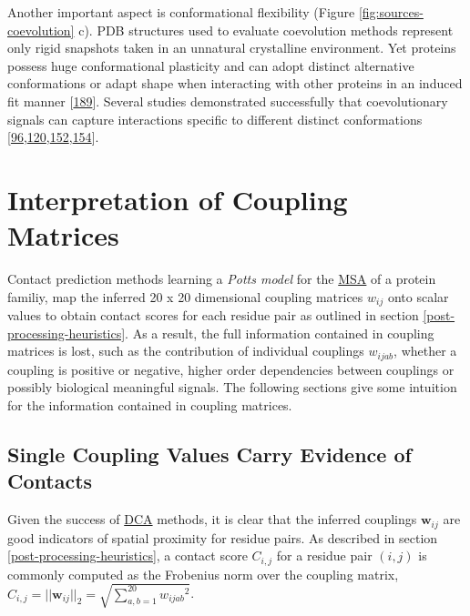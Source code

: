 \documentclass[11pt,a4paper,twoside]{book}
\newcommand{\wij}{\mathbf{w}_{ij}}
\newcommand{\wijab}{w_{ijab}}
\theoremstyle{definition}
\theoremstyle{definition}
\theoremstyle{remark}
\begin{document}
Another important aspect is conformational flexibility (Figure
\ref{fig:sources-coevolution} c). PDB structures used to evaluate
coevolution methods represent only rigid snapshots taken in an unnatural
crystalline environment. Yet proteins possess huge conformational
plasticity and can adopt distinct alternative conformations or adapt
shape when interacting with other proteins in an induced fit manner
{[}\protect\hyperlink{ref-Noel2016}{189}{]}. Several studies
demonstrated successfully that coevolutionary signals can capture
interactions specific to different distinct conformations
{[}\protect\hyperlink{ref-Morcos2011}{96},\protect\hyperlink{ref-Hopf2012}{120},\protect\hyperlink{ref-Sfriso2016}{152},\protect\hyperlink{ref-Jana2014}{154}{]}.

\chapter{Interpretation of Coupling
Matrices}\label{interpreting-coupling-matrices}

Contact prediction methods learning a \emph{Potts model} for the
\protect\hyperlink{abbrev}{MSA} of a protein familiy, map the inferred
20 x 20 dimensional coupling matrices \(w_{ij}\) onto scalar values to
obtain contact scores for each residue pair as outlined in section
\ref{post-processing-heuristics}. As a result, the full information
contained in coupling matrices is lost, such as the contribution of
individual couplings \(\wijab\), whether a coupling is positive or
negative, higher order dependencies between couplings or possibly
biological meaningful signals. The following sections give some
intuition for the information contained in coupling matrices.

\section{Single Coupling Values Carry Evidence of
Contacts}\label{correlation-between-couplings-and-class}

Given the success of \protect\hyperlink{abbrev}{DCA} methods, it is
clear that the inferred couplings \(\wij\) are good indicators of
spatial proximity for residue pairs. As described in section
\ref{post-processing-heuristics}, a contact score \(C_{i,j}\) for a
residue pair \((i,j)\) is commonly computed as the Frobenius norm over
the coupling matrix,
\(C_{i,j}=||\wij||_2 = \sqrt{\sum_{a,b=1}^{20} {\wijab}^2}\).
\end{document}
